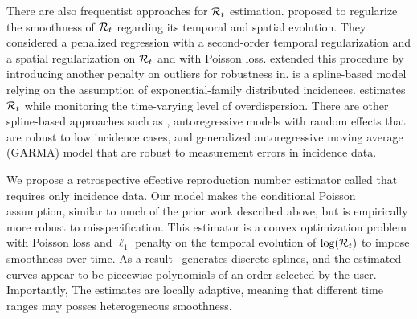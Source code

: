 There are also frequentist approaches for $\mathcal{R}_t$ estimation.
\citet{abry2020spatial} proposed to regularize the smoothness of $\mathcal{R}_t$
regarding its temporal and spatial evolution. They considered a penalized
regression with a second-order temporal regularization and a spatial
regularization on $\mathcal{R}_t$ and with Poisson loss. \citet{pascal2022nonsmooth}
extended this procedure by introducing another penalty on outliers for robustness in.  
%
\cite{pircal2023spline} is a spline-based model relying on the assumption of exponential-family distributed incidences. %
\cite{ho2023accounting} estimates $\mathcal{R}_t$ while monitoring the time-varying
level of overdispersion. 
%
There are other spline-based approaches such as
\cite{azmon2014estimation,gressani2021approximate,pircalabelu2023spline},
autoregressive models with random effects \citep{jin2023epimix} that are robust
to low incidence cases, and generalized autoregressive moving average (GARMA)
model \citep{hettinger2023estimating} that are robust to measurement errors in
incidence data. 
%


We propose a retrospective effective reproduction number estimator
called \RtEstim that requires only incidence data. Our model makes the
conditional Poisson assumption, similar to much of the prior work described
above, but is empirically more robust to misspecification. This estimator is a
convex optimization problem with Poisson loss and $\ell_1$ penalty on the
temporal evolution of $\log(\mathcal{R}_t)$ to impose smoothness over time. 
As a result \RtEstim\ generates discrete splines, and the estimated curves
appear to be piecewise polynomials of an order selected by the user.
Importantly, The estimates are locally adaptive, meaning that different time
ranges may posses heterogeneous smoothness.


